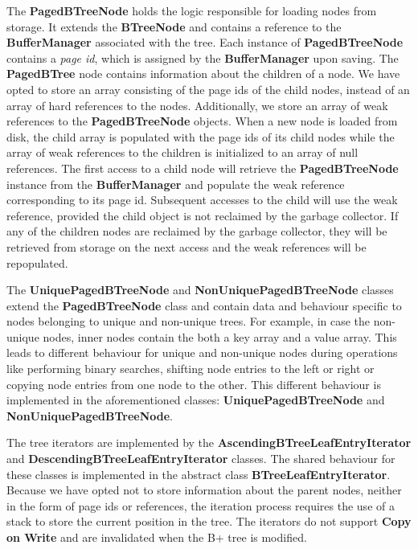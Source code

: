 \documentclass[11pt,a4paper,oneside]{article}
\begin{document}
The \textbf{PagedBTreeNode} holds the logic responsible for loading nodes from storage. It extends the \textbf{BTreeNode} and contains a reference to the \textbf{BufferManager} associated with the tree. Each instance of \textbf{PagedBTreeNode} contains a \textit{page id}, which is assigned by the \textbf{BufferManager} upon saving. The \textbf{PagedBTree} node contains information about the children of a node. We have opted to store an array consisting of the page ids of the child nodes, instead of an array of hard references to the nodes. Additionally, we store an array of weak references to the \textbf{PagedBTreeNode} objects. When a new node is loaded from disk, the child array is populated with the page ids of its child nodes while the array of weak references to the children is initialized to an array of null references. The first access to a child node will retrieve the \textbf{PagedBTreeNode} instance from the \textbf{BufferManager} and populate the weak reference corresponding to its page id. Subsequent accesses to the child will use the weak reference, provided the child object is not reclaimed by the garbage collector. If any of the children nodes are reclaimed by the garbage collector, they will be retrieved from storage on the next access and the weak references will be repopulated.

The \textbf{UniquePagedBTreeNode} and \textbf{NonUniquePagedBTreeNode} classes extend the \textbf{PagedBTreeNode} class and contain data and behaviour specific to nodes belonging to unique and non-unique trees. For example, in case the non-unique nodes, inner nodes contain the both a key array and a value array. This leads to different behaviour for unique and non-unique nodes during operations like performing binary searches, shifting node entries to the left or right or copying node entries from one node to the other. This different behaviour is implemented in the aforementioned classes: \textbf{UniquePagedBTreeNode} and \textbf{NonUniquePagedBTreeNode}. 

The tree iterators are implemented by the \textbf{AscendingBTreeLeafEntryIterator} and \textbf{DescendingBTreeLeafEntryIterator} classes. The shared behaviour for these classes is implemented in the abstract class \textbf{BTreeLeafEntryIterator}. Because we have opted not to store information about the parent nodes, neither in the form of page ids or references, the iteration process requires the use of a stack to store the current position in the tree. The iterators do not support \textbf{Copy on Write} and are invalidated when the B+ tree is modified. 
\end{document}
